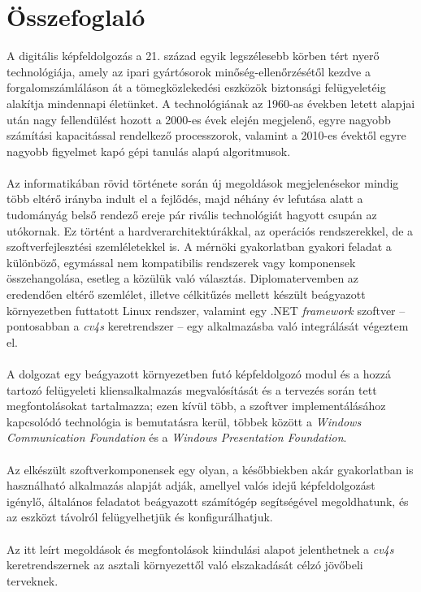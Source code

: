 \chapter*{Összefoglaló}

A digitális képfeldolgozás a 21. század egyik legszélesebb körben tért nyerő technológiája, amely az ipari gyártósorok minőség-ellenőrzésétől kezdve a forgalomszámláláson át a tömegközlekedési eszközök biztonsági felügyeletéig alakítja mindennapi életünket. A technológiának az 1960-as években letett alapjai után nagy fellendülést hozott a 2000-es évek elején megjelenő, egyre nagyobb számítási kapacitással rendelkező processzorok, valamint a 2010-es évektől egyre nagyobb figyelmet kapó gépi tanulás alapú algoritmusok.\\
\\
Az informatikában rövid története során új megoldások megjelenésekor mindig több eltérő irányba indult el a fejlődés, majd néhány év lefutása alatt a tudományág belső rendező ereje pár rivális technológiát hagyott csupán az utókornak. Ez történt a hardverarchitektúrákkal, az operációs rendszerekkel, de a szoftverfejlesztési szemléletekkel is. A mérnöki gyakorlatban gyakori feladat a különböző, egymással nem kompatibilis rendszerek vagy komponensek összehangolása, esetleg a közülük való választás. Diplomatervemben az eredendően eltérő szemlélet, illetve célkitűzés mellett készült beágyazott környezetben futtatott Linux rendszer, valamint egy .NET \emph{framework} szoftver -- pontosabban a \emph{cv4s} keretrendszer -- egy alkalmazásba való integrálását végeztem el.\\
\\
A dolgozat egy beágyazott környezetben futó képfeldolgozó modul és a hozzá tartozó felügyeleti kliensalkalmazás megvalósítását és a tervezés során tett megfontolásokat tartalmazza; ezen kívül több, a szoftver implementálásához kapcsolódó technológia is bemutatásra kerül, többek között a \emph{Windows Communication Foundation} és a \emph{Windows Presentation Foundation}.\\
\\
Az elkészült szoftverkomponensek egy olyan, a későbbiekben akár gyakorlatban is használható alkalmazás alapját adják, amellyel valós idejű képfeldolgozást igénylő, általános feladatot beágyazott számítógép segítségével megoldhatunk, és az eszközt távolról felügyelhetjük és konfigurálhatjuk.\\
\\
Az itt leírt megoldások és megfontolások kiindulási alapot jelenthetnek a \emph{cv4s} keretrendszernek az asztali környezettől való elszakadását célzó jövőbeli terveknek.
